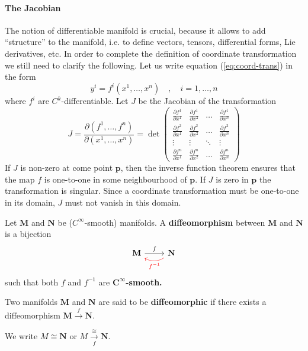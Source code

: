 \documentclass[../main.tex]{subfiles}
\begin{document}
\paragraph{The Jacobian }
The notion of differentiable manifold is crucial, because it allows to add “structure” to
the manifold, i.e. to define vectors, tensors, differential forms, Lie derivatives, etc. In order
to complete the definition of coordinate transformation we still need to clarify the following. Let us write equation (\ref{eq:coord-trans}) in the form \[
y^i=f^i(x^1,\dots,x^n) \quad,\quad i=1,\dots,n
\]
where $f^i$ are $C^k$-differentiable. Let $J$ be the Jacobian of the transformation 
\[
J=\frac{\partial(f^1,\dots,f^n)}{\partial(x^1,\dots,x^n)}=\det
\begin{pmatrix}
\frac{\partial f^1}{\partial x^1} & \frac{\partial f^1}{\partial x^2} & \dots & \frac{\partial f^1}{\partial x^n}\\
\frac{\partial f^2}{\partial x^1} & \frac{\partial f^2}{\partial x^2} & \dots & \frac{\partial f^2}{\partial x^n}\\
\vdots & \vdots & \ddots & \vdots\\
\frac{\partial f^n}{\partial x^1} & \frac{\partial f^n}{\partial x^2} & \dots & \frac{\partial f^n}{\partial x^n}
\end{pmatrix}
\]
If $J$ is non-zero at come point $\mathbf{p}$, then the inverse function theorem ensures that the map $f$ is one-to-one in some neighbourhood of $\mathbf{p}$. If $J$ is zero in $\mathbf{p}$ the transformation is singular. Since a coordinate transformation must be one-to-one in its domain, $J$ must not vanish in this domain.
\begin{definition}
Let $\mathbf{M}$ and $\mathbf{N}$ be ($C^\infty$-smooth) manifolds. A \textbf{diffeomorphism} between $\mathbf{M}$ and $\mathbf{N}$ is a bijection
\[
\begin{tikzcd}
\mathbf{M}\rar{f} & \arrow[red, bend left]{l}[black,swap,below]{\color{red}f^{-1}} \mathbf{N}
\end{tikzcd}
\]
such that both $f$ and $f^{-1}$ are $\mathbf{C}^\infty$\textbf{-smooth.}
\end{definition}
\begin{definition}[Diffeomorphic]
Two manifolds $\mathbf{M}$ and $\mathbf{N}$ are said to be \textbf{diffeomorphic} if there exists a diffeomorphism \(\mathbf{M}\xrightarrow{f}\mathbf{N}\).
\end{definition}
\begin{kaobox}[frametitle=Notation]
We write \(M\cong \mathbf{N}\) or \(M\xrightarrow[f]{\cong}\mathbf{N}\).
\end{kaobox}
\end{document}
